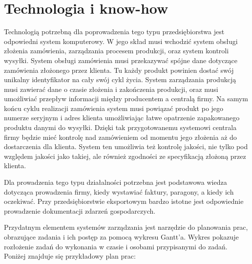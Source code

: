 	\section{Technologia i know-how}
		\par Technologią potrzebną dla poprowadzenia tego typu przedsiębiorstwa jest odpowiedni system komputerowy. W jego skład musi wchodzić system obsługi złożenia zamówienia, zarządzania procesem produkcji, oraz system kontroli wysyłki. System obsługi zamówienia musi przekazywać spójne dane dotyczące zamówienia złożonego przez klienta. Tu każdy produkt powinien dostać swój unikalny identyfikator na cały swój cykl życia. System zarządzania produkcją musi zawierać dane o czasie złożenia i zakończenia produkcji, oraz musi umożliwiać przepływ informacji między producentem a centralą firmy. Na samym końcu cyklu realizacji zamówienia system musi powiązać produkt po jego numerze seryjnym i adres klienta umożliwiając łatwe opatrzenie zapakowanego produktu danymi do wysyłki. Dzięki tak przygotowanemu systemowi centrala firmy będzie mieć kontrolę nad zamówieniem od momentu jego złożenia aż do dostarczenia dla klienta. System ten umożliwia też kontrolę jakości, nie tylko pod względem jakości jako takiej, ale również zgodności ze specyfikacją złożoną przez klienta.
		
		\par Dla prowadzenia tego typu działalności potrzebna jest podstawowa wiedza dotycząca prowadzenia firmy, kiedy wystawiać faktury, paragony, a kiedy ich oczekiwać. Przy przedsiębiorstwie eksportowym bardzo istotne jest odpowiednie prowadzenie dokumentacji zdarzeń gospodarczych.

		\par Przydatnym elementem systemów zarządzania jest narzędzie do planowania prac, obrazujące zadania i ich postęp za pomocą wykresu Gantt'a. Wykres pokazuje rozłożenie zadań do wykonania w czasie i osobami przypisanymi do zadań. Poniżej znajduje się przykładowy plan prac:

		

		
		
	
